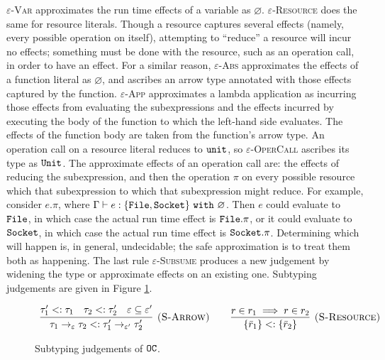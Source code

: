 \textsc{$\varepsilon$-Var} approximates the run time effects of a variable as $\varnothing$. \textsc{$\varepsilon$-Resource} does the same for resource literals. Though a resource captures several effects (namely, every possible operation on itself), attempting to ``reduce'' a resource will incur no effects; something must be done with the resource, such as an operation call, in order to have an effect. For a similar reason, \textsc{$\varepsilon$-Abs} approximates the effects of a function literal as $\varnothing$, and ascribes an arrow type annotated with those effects captured by the function. \textsc{$\varepsilon$-App} approximates a lambda application as incurring those effects from evaluating the subexpressions and the effects incurred by executing the body of the function to which the left-hand side evaluates. The effects of the function body are taken from the function's arrow type. An operation call on a resource literal reduces to $\mathtt{unit}$, so \textsc{$\varepsilon$-OperCall} ascribes its type as $\mathtt{Unit}$.
The approximate effects of an operation call are: the effects of reducing the subexpression, and then the operation $\pi$ on every possible resource which that subexpression to which that subexpression might reduce. For example, consider $e.\pi$, where $\Gamma \vdash e: \{ \mathtt{File, Socket} \}~\mathtt{with}~ \varnothing$. Then $e$ could evaluate to $\mathtt{File}$, in which case the actual run time effect is $\mathtt{File}.\pi$, or it could evaluate to $\mathtt{Socket}$, in which case the actual run time effect is $\mathtt{Socket.\pi}$. Determining which will happen is, in general, undecidable; the safe approximation is to treat them both as happening. The last rule \textsc{$\varepsilon$-Subsume} produces a new judgement by widening the type or approximate effects on an existing one. Subtyping judgements are given in Figure \ref{fig:opercalc_static_rules}.


\begin{figure}[h]
\vspace{-5pt}

\fbox{$\tau <: \tau$}

\[
\begin{array}{c}

\infer[\textsc{(S-Arrow)}]
	{ \tau_1 \rightarrow_{\varepsilon} \tau_2 <: \tau_1' \rightarrow_{\varepsilon'} \tau_2' }
	{ \tau_1' <: \tau_1 & \tau_2 <: \tau_2' & \varepsilon \subseteq \varepsilon' }
	\hspace{5ex}
\infer[\textsc{(S-Resource)}]
	{ \{ \bar r_1 \} <: \{ \bar r_2 \} }
	{ r \in r_1 \implies r \in r_2 }

\end{array}
\]

\vspace{-7pt}
\caption{Subtyping judgements of $\mathtt{OC}$.}
\label{fig:opercalc_static_rules}
\end{figure}

